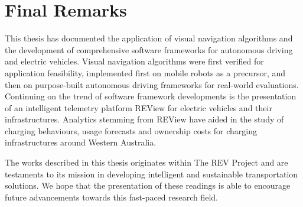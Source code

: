 
\section{Final Remarks}
This thesis has documented the application of visual navigation algorithms and the development of comprehensive software frameworks for autonomous driving and electric vehicles. Visual navigation algorithms were first verified for application feasibility, implemented first on mobile robots as a precursor, and then on purpose-built autonomous driving frameworks for real-world evaluations. Continuing on the trend of software framework developments is the presentation of an intelligent telemetry platform REView for electric vehicles and their infrastructures. Analytics stemming from REView have aided in the study of charging behaviours, usage forecasts and ownership costs for charging infrastructures around Western Australia.

The works described in this thesis originates within The REV Project and are testaments to its mission in developing intelligent and sustainable transportation solutions. We hope that the presentation of these readings is able to encourage future advancements towards this fast-paced research field.